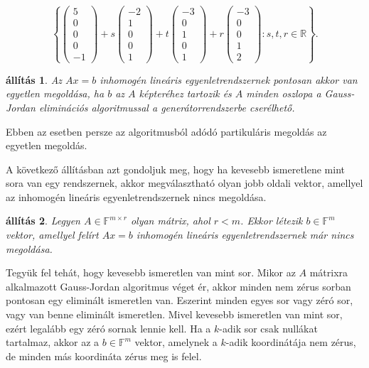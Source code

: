 \documentclass[9pt, a4paper, showtrims]{memoir}
\makeatletter
\renewenvironment{proof}[1][\proofname]
    {\par\pushQED{\qed}%
    \normalfont \topsep6\p@\@plus6\p@\relax
    \trivlist
    \item[\hskip\labelsep
        \itshape
    #1\@addpunct{:}]\ignorespaces}
    {\popQED\endtrivlist\@endpefalse}
\theoremstyle{plain}
\newtheorem{proposition}{állítás}[chapter]
\theoremstyle{remark}
\theoremstyle{definition}
\makeatother
\begin{document}
\[
    \left\{
        \begin{pmatrix}
            5\\0\\0\\0\\-1
        \end{pmatrix}
        +s
        \begin{pmatrix}
            -2\\1\\0\\0\\1
        \end{pmatrix}
        +t
        \begin{pmatrix}
            -3\\0\\1\\0\\1
        \end{pmatrix}
        +r
        \begin{pmatrix}
            -3\\0\\0\\1\\2
        \end{pmatrix}
        :s,t,r\in\mathbb{R}
    \right\}.
\]
\begin{proposition}
    Az $Ax=b$ inhomogén lineáris egyenletrendszernek pontosan akkor van egyetlen 
    megoldása, ha $b$ az $A$ képteréhez tartozik és $A$ minden oszlopa a Gauss-Jordan eliminációs algoritmussal  a generátorrendszerbe cserélhető.
\end{proposition}
Ebben az esetben persze az algoritmusból adódó partikuláris megoldás az egyetlen megoldás.

A következő állításban azt gondoljuk meg, hogy ha kevesebb ismeretlene mint sora van egy rendszernek, akkor megválasztható olyan jobb oldali vektor, amellyel az inhomogén lineáris egyenletrendszernek nincs megoldása.
\begin{proposition}
    Legyen $A\in\mathbb{F}^{m\times r}$ olyan mátrix, ahol $r<m$.
    Ekkor létezik $b\in\mathbb{F}^m$ vektor, 
    amellyel felírt $Ax=b$ inhomogén lineáris egyenletrendszernek már nincs megoldása.
\end{proposition}
\begin{proof}
    Tegyük fel tehát, hogy kevesebb ismeretlen van mint sor.
    Mikor az $A$ mátrixra alkalmazott Gauss-Jordan algoritmus  véget ér, 
    akkor minden nem zérus sorban pontosan egy eliminált ismeretlen van.
    Eszerint minden egyes sor vagy zéró sor, 
    vagy van benne eliminált ismeretlen.
    Mivel kevesebb ismeretlen van mint sor, 
    ezért legalább egy zéró sornak lennie kell.
    Ha a $k$-adik sor csak nullákat tartalmaz, akkor az a $b\in\mathbb{F}^m$ vektor,
    amelynek a $k$-adik koordinátája nem zérus, de minden más koordináta zérus meg is felel.
\end{proof}
\end{document}
